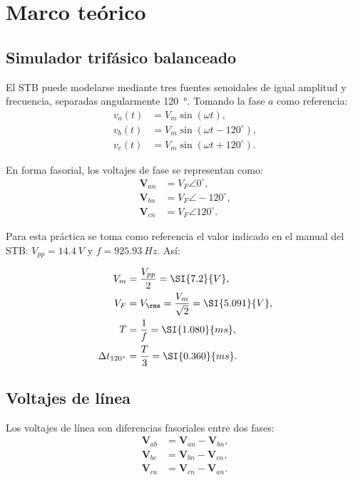 \section{Marco teórico}

\subsection{Simulador trifásico balanceado}
El STB puede modelarse mediante tres fuentes senoidales de igual amplitud y frecuencia, separadas angularmente \SI{120}{\degree}. Tomando la fase $a$ como referencia:
\begin{align}
	v_a(t)&=V_m\sin(\omega t), \\
	v_b(t)&=V_m\sin(\omega t-120^{\circ}), \\
	v_c(t)&=V_m\sin(\omega t+120^{\circ}).
\end{align}

En forma fasorial, los voltajes de fase se representan como:
\begin{align}
	\mathbf{V}_{an}&=V_F\angle 0^{\circ}, \\
	\mathbf{V}_{bn}&=V_F\angle -120^{\circ}, \\
	\mathbf{V}_{cn}&=V_F\angle 120^{\circ}.
\end{align}

Para esta práctica se toma como referencia el valor indicado en el manual del STB: $V_{pp}=\SI{14.4}{V}$ y $f=\SI{925.93}{Hz}$. Así:

\begin{align}
	V_m&=\frac{V_{pp}}{2}=\SI{7.2}{V}, \\
	V_F&=V_{\rms}=\frac{V_m}{\sqrt{2}}=\SI{5.091}{V}, \\
	T&=\frac{1}{f}=\SI{1.080}{ms}, \\
	\Delta t_{120^{\circ}}&=\frac{T}{3}=\SI{0.360}{ms}.
\end{align}

\subsection{Voltajes de línea}
Los voltajes de línea son diferencias fasoriales entre dos fases:
\begin{align}
	\mathbf{V}_{ab}&=\mathbf{V}_{an}-\mathbf{V}_{bn}, \\
	\mathbf{V}_{bc}&=\mathbf{V}_{bn}-\mathbf{V}_{cn}, \\
	\mathbf{V}_{ca}&=\mathbf{V}_{cn}-\mathbf{V}_{an}.
\end{align}


